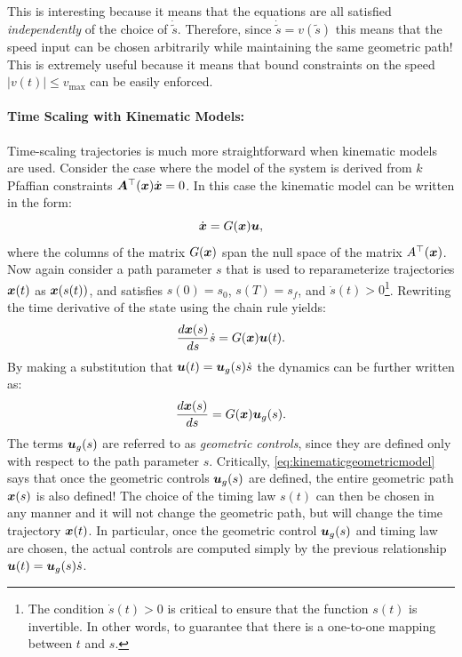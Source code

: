\begin{example}
This is interesting because it means that the equations are all satisfied \textit{independently} of the choice of $\dot{\tilde{s}}$. Therefore, since $\dot{\tilde{s}} = v(\tilde{s})$ this means that the speed input can be chosen arbitrarily while maintaining the same geometric path! This is extremely useful because it means that bound constraints on the speed $\lvert v(t)\rvert \leq v_\text{max}$ can be easily enforced.
\end{example}


\paragraph{Time Scaling with Kinematic Models:} Time-scaling trajectories is much more straightforward when kinematic models are used. Consider the case where the model of the system is derived from $k$ Pfaffian constraints $\bm{A}^\top (\bm{x})\dot{\bm{x}} = 0$. In this case the kinematic model can be written in the form:
\begin{equation} \label{eq:kinmodel}
    \dot{\bm{x}} = G(\bm{x}) \bm{u},
\end{equation}
where the columns of the matrix $G(\bm{x})$ span the null space of the matrix $A^\top (\bm{x})$. Now again consider a path parameter $s$ that is used to reparameterize trajectories $\bm{x}(t)$ as $\bm{x}(s(t))$, and satisfies $s(0) = s_0$, $s(T) = s_f$, and $\dot{s}(t) > 0$\footnote{The condition $\dot{s}(t) > 0$ is critical to ensure that the function $s(t)$ is invertible. In other words, to guarantee that there is a one-to-one mapping between $t$ and $s$.}. Rewriting the time derivative of the state using the chain rule yields:
\begin{equation}
    \frac{d\bm{x}(s)}{ds} \dot{s} = G(\bm{x}) \bm{u}(t).
\end{equation}
By making a substitution that $\bm{u}(t) =  \bm{u}_g(s)\dot{s}$ the dynamics can be further written as:
\begin{equation} \label{eq:kinematicgeometricmodel}
    \frac{d\bm{x}(s)}{ds} = G(\bm{x})\bm{u}_g(s).
\end{equation}
The terms $\bm{u}_g(s)$ are referred to as \textit{geometric controls}, since they are defined only with respect to the path parameter $s$. Critically, \eqref{eq:kinematicgeometricmodel} says that once the geometric controls $\bm{u}_g(s)$ are defined, the entire geometric path $\bm{x}(s)$ is also defined! The choice of the timing law $s(t)$ can then be chosen in any manner and it will not change the geometric path, but will change the time trajectory $\bm{x}(t)$. In particular, once the geometric control $\bm{u}_g(s)$ and timing law are chosen, the actual controls are computed simply by the previous relationship $\bm{u}(t) =  \bm{u}_g(s)\dot{s}$.

